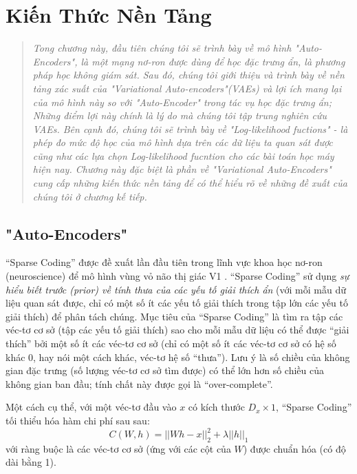 \chapter{Kiến Thức Nền Tảng}
\ifpdf
    \graphicspath{{Chapter2/Chapter2Figs/PNG/}{Chapter2/Chapter2Figs/PDF/}{Chapter2/Chapter2Figs/}}
\else
    \graphicspath{{Chapter2/Chapter2Figs/EPS/}{Chapter2/Chapter2Figs/}}
\fi

\begin{quote}
\textit{Tong chương này, đầu tiên chúng tôi sẽ trình bày về mô hình "Auto-Encoders", là một mạng nơ-ron được dùng để học đặc trưng ẩn, là phương pháp học không giám sát.
Sau đó, chúng tôi giới thiệu và trình bày về nền tảng xác suất của "Variational Auto-encoders"(VAEs) và lợi ích mang lại của mô hình này so với "Auto-Encoder" trong tác vụ học đặc trưng ẩn; Những điểm lợi này chính là lý do mà chúng tôi tập trung nghiên cứu VAEs. Bên cạnh đó, chúng tôi sẽ trình bày về "Log-likelihood fuctions" - là phép đo mức độ học của mô hình dựa trên các dữ liệu ta quan sát được cũng như các lựa chọn Log-likelihood fucntion cho các bài toán học máy hiện nay. Chương này đặc biệt là phần về "Variational Auto-Encoders" cung cấp những kiến thức nền tảng để có thể hiểu rõ về những đề xuất của chúng tôi ở chương kế tiếp.}
\end{quote}
\section{"Auto-Encoders"}
``Sparse Coding'' được đề xuất lần đầu tiên trong lĩnh vực khoa học nơ-ron (neuroscience) để mô hình vùng vỏ não thị giác V1 \cite{olshausen1996emergence}. ``Sparse Coding'' sử dụng \emph{sự hiểu biết trước (prior) về tính thưa của các yếu tố giải thích ẩn} (với mỗi mẫu dữ liệu quan sát được, chỉ có một số ít các yếu tố giải thích trong tập lớn các yếu tố giải thích) để phân tách chúng. Mục tiêu của ``Sparse Coding'' là tìm ra tập các véc-tơ cơ sở (tập các yếu tố giải thích) sao cho mỗi mẫu dữ liệu có thể được ``giải thích'' bởi một số ít các véc-tơ cơ sở (chỉ có một số ít các véc-tơ cơ sở có hệ số khác 0, hay nói một cách khác, véc-tơ hệ số ``thưa''). Lưu ý là số chiều của không gian đặc trưng (số lượng véc-tơ cơ sở tìm được) có thể lớn hơn số chiều của không gian ban đầu; tính chất này được gọi là ``over-complete''.

Một cách cụ thể, với một véc-tơ đầu vào $x$ có kích thước $D_x \times 1$, ``Sparse Coding'' tối thiểu hóa hàm chi phí sau sau:
\begin{equation} \label{eq_SparseCoding}
	C(W, h) = ||Wh - x||_2^2 + \lambda||h||_1
\end{equation}
với ràng buộc là các véc-tơ cơ sở (ứng với các cột của $W$) được chuẩn hóa (có độ dài bằng 1).

